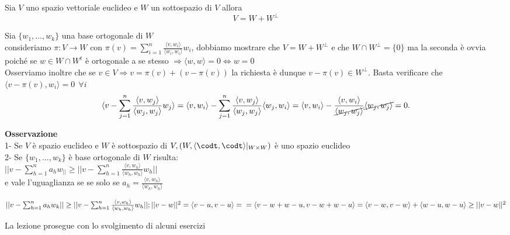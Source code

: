 \documentclass[12px]{article}
\begin{document}
	\newpage
\begin{prop}
	Sia $V$ uno spazio vettoriale euclideo e $W$ un sottospazio di $V$ allora \[ V = W + W^\perp\]
\end{prop}
	\begin{dimo}
		Sia $\{w_1,\ldots,w_k\}$ una base ortogonale di $W$ \\ consideriamo $\pi :V \rightarrow W$ con $ \pi(v) = \sum^n_{i=1}\frac{ \langle v, w_i \rangle }{ \langle w_i, w_i \rangle} w_i$, dobbiamo mostrare che $V = W + W^\perp$ e che $W\cap W^\perp = \{0\}$ ma la seconda è ovvia poiché se $w\in W\cap W^t$ è ortogonale a se stesso $ \Rightarrow \langle w, w \rangle = 0 \Leftrightarrow w = 0$\\
		Osserviamo inoltre che se $v\in V \Rightarrow  v = \pi(v) + (v - \pi(v))$ la richiesta è dunque $v - \pi(v)\in W^\perp$. Basta verificare che $ \langle v - \pi(v), w_i \rangle = 0 \ \ \forall i$
		\[
			\langle v - \sum^n_{j=1} \frac{ \langle v, w_j \rangle} {\langle w_j, w_j \rangle} w_j\rangle = \langle v, w_i \rangle  - \sum^n_{j=1} \frac{ \langle v, w_j \rangle }{ \langle w_j, w_j \rangle } \langle w_j, w_i \rangle  = \langle v, w_i \rangle  - \frac{\langle v,w_i\rangle }{\cancel{ \langle w_j, w_j \rangle }} \cancel{\langle w_j, w_j \rangle } =0
		.\]
	\end{dimo}
	\textbf{Osservazione}\\
	1- Se $V$ è spazio euclideo e $W$ è sottospazio di $V, \\(W, \langle \codt, \codt \rangle |_{W\times W})$ è uno spazio euclideo\\
	2- Se $\{w_1,\ldots, w_k\}$ è base ortogonale di $W$ risulta:\\ $|| v- \sum^n_{h=1}a_hw_||\geq||v - \sum^n_{h=1}\frac{ \langle v, w_h \rangle }{ \langle w_h, w_h \rangle} w_h||$ \\e vale l'uguaglianza se se solo se $a_h = \frac{ \langle v, w_h \rangle }{ \langle w_h, w_h \rangle }$
	\begin{dimo}[Punto 2]
		$||v - \sum^n_{h=1}a_hw_k||\geq||v-\sum^n_{h=1}\frac{ \langle v, w_h \rangle }{ \langle w_h, w_h \rangle }w_h||; \\ ||v-w||^2 = \langle v - u, v - u \rangle  =\\= \langle v - w + w - u, v - w + w - u \rangle = \langle v - w, v - w \rangle  + \langle w - u, w - u \rangle \geq ||v-w||^2$
	\end{dimo}
	La lezione prosegue con lo svolgimento di alcuni esercizi
\end{document}
